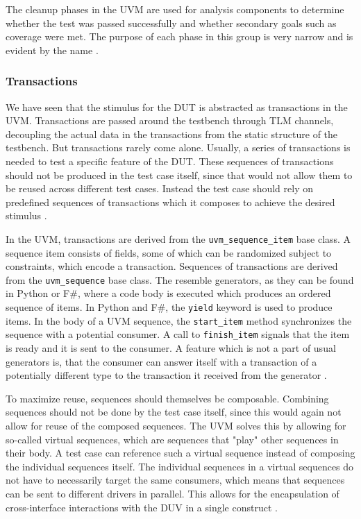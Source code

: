 \documentclass[11pt]{report}
\newcommand{\ttt}{\texttt}
\begin{document}
The cleanup phases in the UVM are used for analysis components to determine whether the test was passed successfully
and whether secondary goals such as coverage were met. The purpose of each phase in this group is very narrow and is
evident by the name \cite[ch. 4.6]{mehta2018asic}.

\subsubsection{Transactions} %

We have seen that the stimulus for the DUT is abstracted as transactions in the UVM. Transactions are passed around the testbench through TLM channels, decoupling the actual data in the transactions from the static structure of the testbench. But transactions rarely come alone. Usually, a series of transactions is needed to test a specific feature of the DUT. These sequences of transactions should not be produced in the test case itself, since that would not allow them to be reused across different test cases. Instead the test case should rely on predefined sequences of transactions which it composes to achieve the desired stimulus \cite[Ch. 23]{salemi2013uvm}.

In the UVM, transactions are derived from the \texttt{uvm\_sequence\_item} base class. A sequence item consists of fields, some of which can be randomized subject to constraints, which encode a transaction. Sequences of transactions are derived from the \ttt{uvm\_sequence} base class. The resemble generators, as they can be found in Python or F\#, where a code body is executed which produces an ordered sequence of items. In Python and F\#, the \ttt{yield} keyword is used to produce items. In the body of a UVM sequence, the \ttt{start\_item} method synchronizes the sequence with a potential consumer. A call to \ttt{finish\_item} signals that the item is ready and it is sent to the consumer. A feature which is not a part of usual generators is, that the consumer can answer itself with a transaction of a potentially different type to the transaction it received from the generator \cite[Ch. 4.3]{mehta2018asic}.

To maximize reuse, sequences should themselves be composable. Combining sequences should not be done by the test case itself, since this would again not allow for reuse of the composed sequences. The UVM solves this by allowing for so-called virtual sequences, which are sequences that "play" other sequences in their body. A test case can reference such a virtual sequence instead of composing the individual sequences itself. The individual sequences in a virtual sequences do not have to necessarily target the same consumers, which means that sequences can be sent to different drivers in parallel. This allows for the encapsulation of cross-interface interactions with the DUV in a single construct \cite[Ch. 23]{salemi2013uvm}.
\end{document}
